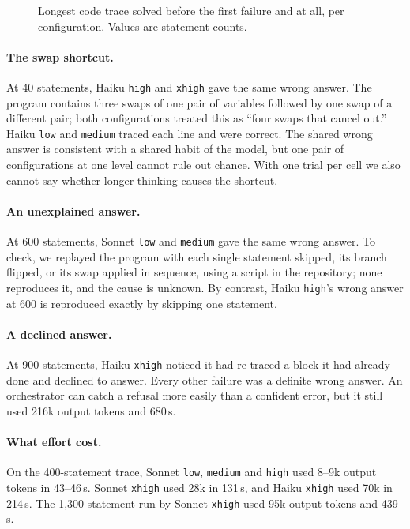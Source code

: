 \begin{figure}[H]
\centering

\caption{Longest code trace solved before the first failure and at all, per configuration. Values are statement counts.}
\label{fig:reasoning-trace}
\end{figure}

\paragraph{The swap shortcut.} At 40 statements, Haiku \texttt{high} and \texttt{xhigh} gave the same wrong answer. The program contains three swaps of one pair of variables followed by one swap of a different pair; both configurations treated this as ``four swaps that cancel out.'' Haiku \texttt{low} and \texttt{medium} traced each line and were correct. The shared wrong answer is consistent with a shared habit of the model, but one pair of configurations at one level cannot rule out chance. With one trial per cell we also cannot say whether longer thinking causes the shortcut.

\paragraph{An unexplained answer.} At 600 statements, Sonnet \texttt{low} and \texttt{medium} gave the same wrong answer. To check, we replayed the program with each single statement skipped, its branch flipped, or its swap applied in sequence, using a script in the repository; none reproduces it, and the cause is unknown. By contrast, Haiku \texttt{high}'s wrong answer at 600 is reproduced exactly by skipping one statement.

\paragraph{A declined answer.} At 900 statements, Haiku \texttt{xhigh} noticed it had re-traced a block it had already done and declined to answer. Every other failure was a definite wrong answer. An orchestrator can catch a refusal more easily than a confident error, but it still used 216k output tokens and 680\,s.

\paragraph{What effort cost.} On the 400-statement trace, Sonnet \texttt{low}, \texttt{medium} and \texttt{high} used 8--9k output tokens in 43--46\,s. Sonnet \texttt{xhigh} used 28k in 131\,s, and Haiku \texttt{xhigh} used 70k in 214\,s. The 1,300-statement run by Sonnet \texttt{xhigh} used 95k output tokens and 439\,s.

